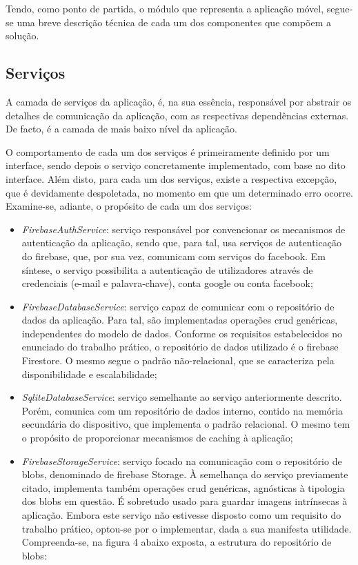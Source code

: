 \documentclass[12pt]{report}
\begin{document}
Tendo, como ponto de partida, o módulo que representa a aplicação móvel, segue-se uma breve descrição técnica de cada um dos componentes que compõem a solução.

\subsection{Serviços}

A camada de serviços da aplicação, é, na sua essência, responsável por abstrair os detalhes de comunicação da aplicação, com as respectivas dependências externas. De facto, é a camada de mais baixo nível da aplicação. 

O comportamento de cada um dos serviços é primeiramente definido por um interface, sendo depois o serviço concretamente implementado, com base no dito interface. Além disto, para cada um dos serviços, existe a respectiva excepção, que é devidamente despoletada, no momento em que um determinado erro ocorre. Examine-se, adiante, o propósito de cada um dos serviços:

\begin{itemize}
    \item \emph{FirebaseAuthService}: serviço responsável por convencionar os mecanismos de autenticação da aplicação, sendo que, para tal, usa serviços de autenticação do \gls{firebase}, que, por sua vez, comunicam com serviços do \gls{facebook}. Em síntese, o serviço possibilita a autenticação de utilizadores através de credenciais (e-mail e palavra-chave), conta \gls{google} ou conta \gls{facebook};
    
    \item \emph{FirebaseDatabaseService}: serviço capaz de comunicar com o repositório de dados da aplicação. Para tal, são implementadas operações \gls{crud} genéricas, independentes do modelo de dados. Conforme os requisitos estabelecidos no enunciado do trabalho prático, o repositório de dados utilizado é o \gls{firebase} Firestore. O mesmo segue o padrão não-relacional, que se caracteriza pela disponibilidade e escalabilidade;
    
    \item \emph{SqliteDatabaseService}: serviço semelhante ao serviço anteriormente descrito. Porém, comunica com um repositório de dados interno, contido na memória secundária do dispositivo, que implementa o padrão relacional. O mesmo tem o propósito de proporcionar mecanismos de \gls{caching} à aplicação;
    
    \item \emph{FirebaseStorageService}: serviço focado na comunicação com o repositório de \gls{blobs}, denominado de \gls{firebase} Storage. À semelhança do serviço previamente citado, implementa também operações \gls{crud} genéricas, agnósticas à tipologia dos \gls{blobs} em questão. É sobretudo usado para guardar imagens intrínsecas à aplicação. Embora este serviço não estivesse disposto como um requisito do trabalho prático, optou-se por o implementar, dada a sua manifesta utilidade. Compreenda-se, na figura 4 abaixo exposta, a estrutura do repositório de \gls{blobs}:
\end{itemize}
\end{document}
